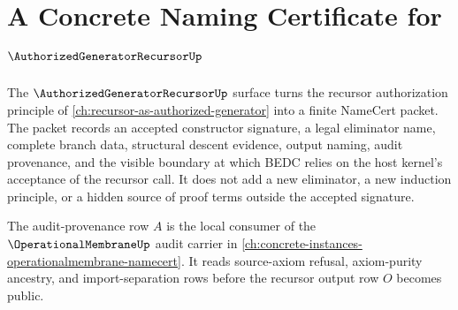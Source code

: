 \chapter{A Concrete Naming Certificate for $\AuthorizedGeneratorRecursorUp$}
\label{ch:concrete-instances-authorizedgeneratorrecursor-namecert}

The $\AuthorizedGeneratorRecursorUp$ surface turns the recursor authorization principle of \autoref{ch:recursor-as-authorized-generator} into a finite NameCert packet. The packet records an accepted constructor signature, a legal eliminator name, complete branch data, structural descent evidence, output naming, audit provenance, and the visible boundary at which BEDC relies on the host kernel's acceptance of the recursor call. It does not add a new eliminator, a new induction principle, or a hidden source of proof terms outside the accepted signature.

The audit-provenance row $A$ is the local consumer of the $\OperationalMembraneUp$ audit carrier in \autoref{ch:concrete-instances-operationalmembrane-namecert}. It reads source-axiom refusal, axiom-purity ancestry, and import-separation rows before the recursor output row $O$ becomes public.

